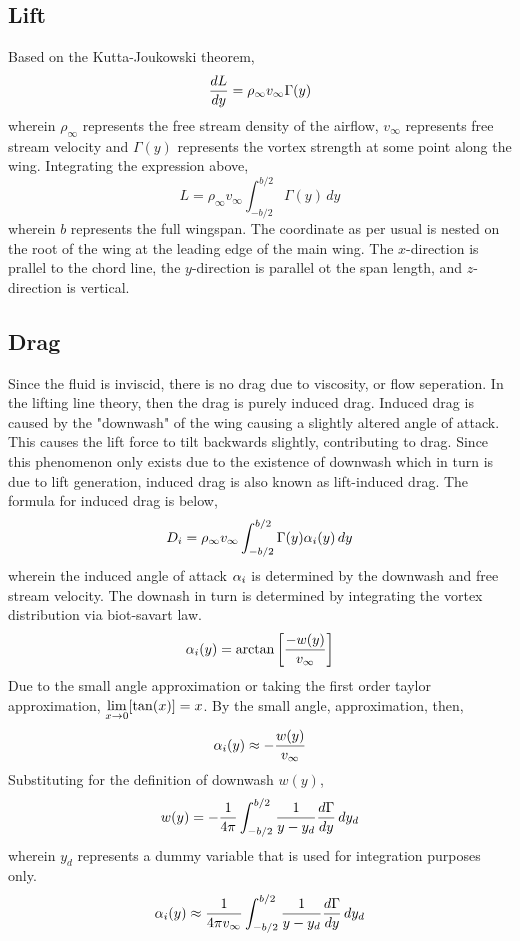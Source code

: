 \documentclass[a4paper, 12pt]{report}
\begin{document}
\begin{center}
\subsection{Lift}
\begin{comment}
\end{comment}
Based on the Kutta-Joukowski theorem,
$$\frac{dL}{dy} = \rho_\infty v_\infty \Gamma(y)$$
wherein $\rho_\infty$ represents the free stream density of the airflow, $v_\infty$ represents free stream velocity and $\Gamma(y)$ represents the vortex strength at some point along the wing. Integrating the expression above,
$$L = \rho_\infty v_\infty\int^{b/2}_{-b/2}\Gamma(y)\,dy$$
wherein $b$ represents the full wingspan. The coordinate as per usual is nested on the root of the wing at the leading edge of the main wing. The $x$-direction is prallel to the chord line, the $y$-direction is parallel ot the span length, and $z$-direction is vertical.
\subsection{Drag}
\begin{comment}
\end{comment}
Since the fluid is inviscid, there is no drag due to viscosity, or flow seperation. In the lifting line theory, then the drag is purely induced drag. Induced drag is caused by the "downwash" of the wing causing a slightly altered angle of attack. This causes the lift force to tilt backwards slightly, contributing to drag. Since this phenomenon only exists due to the existence of downwash which in turn is due to lift generation, induced drag is also known as lift-induced drag. The formula for induced drag is below,
$$D_i = \rho_\infty v_\infty\int^{b/2}_{-b/2}\Gamma(y)\alpha_i(y)\,dy$$
wherein the induced angle of attack $\alpha_i$ is determined by the downwash and free stream velocity. The downash in turn is determined by integrating the vortex distribution via biot-savart law.
$$\alpha_i(y) = \arctan\left[\frac{-w(y)}{v_\infty}\right]$$
Due to the small angle approximation or taking the first order taylor approximation, $\displaystyle{\lim_{x\to0}[\tan(x)] = x}$. By the small angle, approximation, then,
$$\alpha_i(y) \approx -\frac{w(y)}{v_\infty}$$
Substituting for the definition of downwash $w(y)$,
$$w(y) = -\frac{1}{4\pi}\int^{b/2}_{-b/2}\frac{1}{y-y_d}\frac{d\Gamma}{dy}\, dy_d$$
wherein $y_d$ represents a dummy variable that is used for integration purposes only.
$$\alpha_i(y) \approx \frac{1}{4\pi v_\infty}\int^{b/2}_{-b/2}\frac{1}{y-y_d}\frac{d\Gamma}{dy}\, dy_d$$

\end{center}
\end{document}
